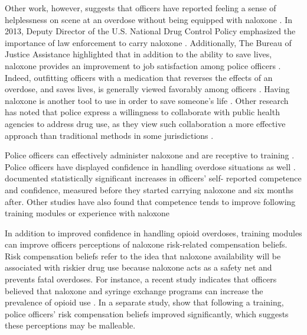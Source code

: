 Other work, however, suggests that officers have reported feeling a sense of helplessness on scene at an overdose without being equipped with naloxone \parencite{banta-green_police_2013, white_moving_2021}. In 2013, Deputy Director of the U.S. National Drug Control Policy emphasized the importance of law enforcement to carry naloxone \parencite{michael_botticelli_announcing_2013}. Additionally, The Bureau of Justice Assistance highlighted that in addition to the ability to save lives, naloxone provides an improvement to job satisfaction among police officers \parencite{bureau_of_justice_assistance_law_nodate}. Indeed, outfitting officers with a medication that reverses the effects of an overdose, and saves lives, is generally viewed favorably among officers \parencite{lloyd_its_2023, purviance_law_2017, wagner_training_2016, white_narcan_2021}. Having naloxone is another tool to use in order to save someone's life \parencite{lloyd_its_2023}. Other research has noted that police express a willingness to collaborate with public health agencies to address drug use, as  they view such collaboration a more effective approach than traditional methods in some jurisdictions \parencite{lloyd_its_2023, white_moving_2021}.

Police officers can effectively administer naloxone and are receptive to training \parencite{lloyd_its_2023, pourtaher_naloxone_2022, purviance_law_2017, wagner_training_2016}. Police officers have displayed confidence in handling overdose situations as well \parencite{purviance_law_2017, ray_police_2015}. \textcite{white_narcan_2021} documented statistically significant increases in officers’ self- reported competence and confidence, measured before they started carrying naloxone and six months after. Other studies have also found that competence tends to improve following training modules or experience with naloxone \parencite{wagner_training_2016} 

In addition to improved confidence in handling opioid overdoses, training modules can improve officers perceptions of naloxone risk-related compensation beliefs. Risk compensation beliefs refer to the idea that naloxone availability will be associated with riskier drug use because naloxone acts as a safety net and prevents fatal overdoses. For instance, a recent study indicates that officers believed that naloxone and syringe exchange programs can increase the prevalence of opioid use \parencite{reichert_police_2023}. In a separate study, \textcite{winograd_concerns_2019} show that following a training, police officers' risk compensation beliefs improved significantly, which suggests these perceptions may be malleable.

